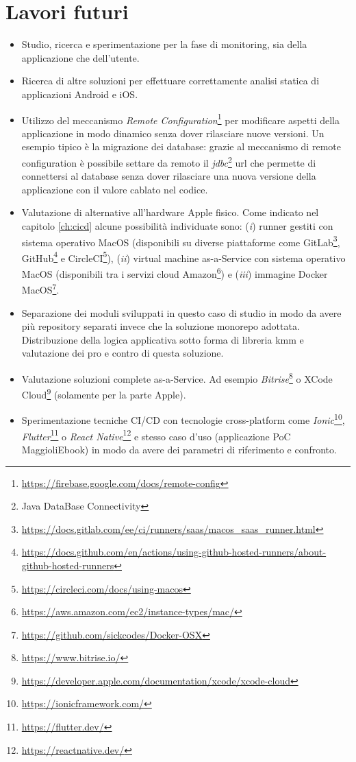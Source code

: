 \section{Lavori futuri}
\begin{itemize}
        \item Studio, ricerca e sperimentazione per la fase di monitoring, sia della applicazione che dell'utente.
        \item Ricerca di altre soluzioni per effettuare correttamente analisi statica di applicazioni Android e iOS.
        \item Utilizzo del meccanismo \textit{Remote Configuration}\footnote{\url{https://firebase.google.com/docs/remote-config}} per modificare aspetti della applicazione in modo dinamico senza dover rilasciare nuove versioni. Un esempio tipico è la migrazione dei database: grazie al meccanismo di remote configuration è possibile settare da remoto il \textit{jdbc}\footnote{Java DataBase Connectivity} url che permette di connettersi al database senza dover rilasciare una nuova versione della applicazione con il valore cablato nel codice.
        \item Valutazione di alternative all'hardware Apple fisico. Come indicato nel capitolo \ref{ch:cicd} alcune possibilità individuate sono: (\textit{i}) runner gestiti con sistema operativo MacOS (disponibili su diverse piattaforme come GitLab\footnote{\url{https://docs.gitlab.com/ee/ci/runners/saas/macos_saas_runner.html}}, GitHub\footnote{\url{https://docs.github.com/en/actions/using-github-hosted-runners/about-github-hosted-runners}} e CircleCI\footnote{\url{https://circleci.com/docs/using-macos}}), (\textit{ii}) virtual machine as-a-Service con sistema operativo MacOS (disponibili tra i servizi cloud Amazon\footnote{\url{https://aws.amazon.com/ec2/instance-types/mac/}}) e (\textit{iii}) immagine Docker MacOS\footnote{\url{https://github.com/sickcodes/Docker-OSX}}.
        \item Separazione dei moduli sviluppati in questo caso di studio in modo da avere più repository separati invece che la soluzione monorepo adottata. Distribuzione della logica applicativa sotto forma di libreria kmm e valutazione dei pro e contro di questa soluzione.
        \item Valutazione soluzioni complete as-a-Service. Ad esempio \textit{Bitrise}\footnote{\url{https://www.bitrise.io/}} o XCode Cloud\footnote{\url{https://developer.apple.com/documentation/xcode/xcode-cloud}} (solamente per la parte Apple).
        \item Sperimentazione tecniche CI/CD con tecnologie cross-platform come \textit{Ionic}\footnote{\url{https://ionicframework.com/}}, \textit{Flutter}\footnote{\url{https://flutter.dev/}} o \textit{React Native}\footnote{\url{https://reactnative.dev/}} e stesso caso d'uso (applicazione PoC MaggioliEbook) in modo da avere dei parametri di riferimento e confronto.
\end{itemize}